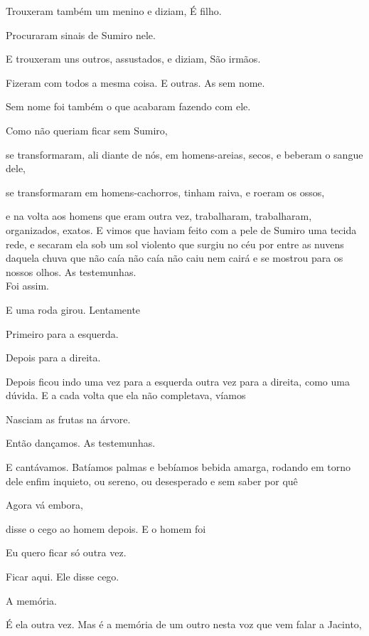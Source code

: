 Trouxeram também um menino e diziam, É filho.

Procuraram sinais de Sumiro nele.

E trouxeram uns outros, assustados, e diziam, São irmãos.

Fizeram com todos a mesma coisa. E outras. As sem nome.

Sem nome foi também o que acabaram fazendo com ele.

Como não queriam ficar sem Sumiro,

se transformaram, ali diante de nós, em homens-areias, secos, e beberam
o sangue dele,

se transformaram em homens-cachorros, tinham raiva, e roeram os ossos,

e na volta aos homens que eram outra vez, trabalharam, trabalharam,
organizados, exatos. E vimos que haviam feito com a pele de Sumiro uma
tecida rede, e secaram ela sob um sol violento que surgiu no céu por
entre as nuvens daquela chuva que não caía não caía não caiu nem cairá e
se mostrou para os nossos olhos. As testemunhas.\\

Foi assim.

E uma roda girou. Lentamente

Primeiro para a esquerda.

Depois para a direita.

Depois ficou indo uma vez para a esquerda outra vez para a direita, como
uma dúvida. E a cada volta que ela não completava, víamos

Nasciam as frutas na árvore.

Então dançamos. As testemunhas.

E cantávamos. Batíamos palmas e bebíamos bebida amarga, rodando em torno
dele enfim inquieto, ou sereno, ou desesperado e sem saber por quê

\pagebreak

\vspace*{4cm}

Agora vá embora,

disse o cego ao homem depois. E o homem foi

Eu quero ficar só outra vez.

Ficar aqui. Ele disse cego.

\pagebreak

\vspace*{4cm}

A memória.

É ela outra vez. Mas é a memória de um outro nesta voz que vem falar a
Jacinto,\\

